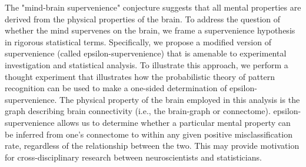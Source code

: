 The "mind-brain supervenience" conjecture suggests that all mental properties are derived from the physical properties of the brain. To address the question of whether the mind supervenes on the brain, we frame a supervenience hypothesis in rigorous statistical terms. Specifically, we propose a modified version of supervenience (called epsilon-supervenience) that is amenable to experimental investigation and statistical analysis. To illustrate this approach, we perform a thought experiment that illustrates how the probabilistic theory of pattern recognition can be used to make a one-sided determination of epsilon-supervenience. The physical property of the brain employed in this analysis is the graph describing brain connectivity (i.e., the brain-graph or connectome). epsilon-supervenience allows us to determine whether a particular mental property can be inferred from one's connectome to within any given positive misclassification rate, regardless of the relationship between the two. This may provide motivation for cross-disciplinary research between neuroscientists and statisticians.